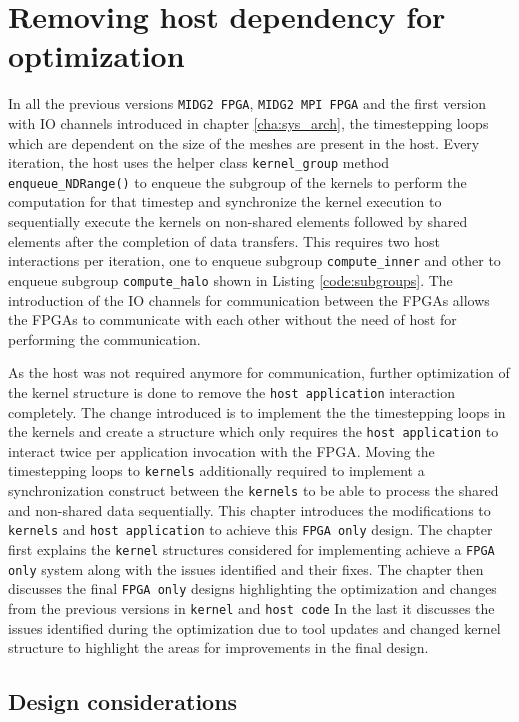 \chapter{Removing host dependency for optimization}
\label{cha:sys_fpgaonly}

In all the previous versions \texttt{MIDG2 FPGA}, \texttt{MIDG2 MPI FPGA} and the
first version with IO channels introduced in chapter \ref{cha:sys_arch},  the timestepping
loops which are dependent on the size of the meshes are present in the host.
Every iteration, the host uses the helper class \texttt{kernel\_group} method
\texttt{enqueue\_NDRange()} to enqueue the subgroup of the kernels to perform the
computation for that timestep and synchronize the kernel execution to sequentially
execute the kernels on non-shared elements followed by shared elements after the completion
of data transfers. This requires two host interactions per iteration, one to enqueue subgroup
\texttt{compute\_inner} and other to enqueue subgroup \texttt{compute\_halo} shown in Listing \ref{code:subgroups}.
The introduction of the IO channels for communication between the FPGAs allows the FPGAs
to communicate with each other without the need of host
for performing the communication.

As the host was not required anymore for communication, further optimization of the kernel structure
is done to remove the \texttt{host application} interaction completely. The change introduced is to implement the
the timestepping loops in the kernels and create a structure which only requires the \texttt{host application} to interact twice
per application invocation with the FPGA. Moving the timestepping loops to \texttt{kernels} additionally
required to implement a synchronization construct between the \texttt{kernels} to be able to process
the shared and non-shared data sequentially. This chapter introduces the modifications to \texttt{kernels}
and \texttt{host application} to achieve this \texttt{FPGA only} design. The chapter first
explains the \texttt{kernel} structures considered for implementing achieve a \texttt{FPGA only} system
along with the issues identified and their fixes. The chapter then discusses the final \texttt{FPGA only}
designs highlighting the optimization and changes from the previous versions in \texttt{kernel} and \texttt{host code}
In the last it discusses the issues identified during the optimization due to tool updates and changed kernel
structure to highlight the areas for improvements in the final design.

\section{Design considerations}

